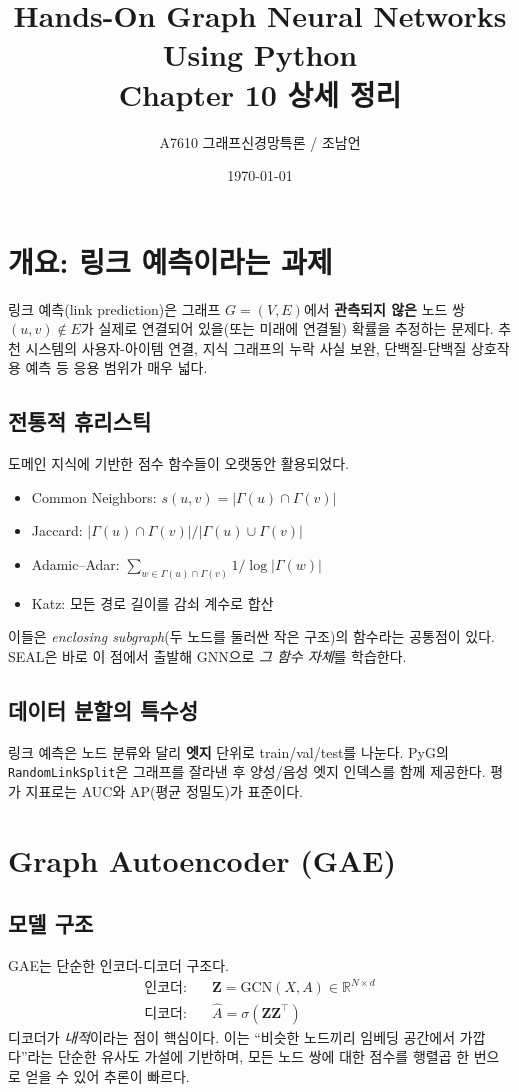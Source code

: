 \documentclass[11pt,a4paper]{article}
\title{Hands-On Graph Neural Networks Using Python\\Chapter 10 상세 정리}
\author{A7610 그래프신경망특론 / 조남언}
\date{\today}
\begin{document}
\maketitle
\tableofcontents
\newpage

\section{개요: 링크 예측이라는 과제}
링크 예측(link prediction)은 그래프 $G=(V,E)$에서 \textbf{관측되지 않은} 노드 쌍 $(u,v)\notin E$가
실제로 연결되어 있을(또는 미래에 연결될) 확률을 추정하는 문제다. 추천 시스템의 사용자-아이템 연결,
지식 그래프의 누락 사실 보완, 단백질-단백질 상호작용 예측 등 응용 범위가 매우 넓다.

\subsection{전통적 휴리스틱}
도메인 지식에 기반한 점수 함수들이 오랫동안 활용되었다.
\begin{itemize}[leftmargin=*]
  \item Common Neighbors: $s(u,v) = |\Gamma(u)\cap\Gamma(v)|$
  \item Jaccard: $|\Gamma(u)\cap\Gamma(v)|/|\Gamma(u)\cup\Gamma(v)|$
  \item Adamic--Adar: $\sum_{w\in\Gamma(u)\cap\Gamma(v)} 1/\log|\Gamma(w)|$
  \item Katz: 모든 경로 길이를 감쇠 계수로 합산
\end{itemize}
이들은 \emph{enclosing subgraph}(두 노드를 둘러싼 작은 구조)의 함수라는 공통점이 있다.
SEAL은 바로 이 점에서 출발해 GNN으로 \emph{그 함수 자체}를 학습한다.

\subsection{데이터 분할의 특수성}
링크 예측은 노드 분류와 달리 \textbf{엣지} 단위로 train/val/test를 나눈다.
PyG의 \texttt{RandomLinkSplit}은 그래프를 잘라낸 후 양성/음성 엣지 인덱스를 함께 제공한다.
평가 지표로는 AUC와 AP(평균 정밀도)가 표준이다.

\section{Graph Autoencoder (GAE)}
\subsection{모델 구조}
GAE는 단순한 인코더-디코더 구조다.
\begin{align*}
  \text{인코더}: & \quad \mathbf{Z} = \mathrm{GCN}(X,A) \in \mathbb{R}^{N\times d} \\
  \text{디코더}: & \quad \hat{A} = \sigma(\mathbf{Z}\mathbf{Z}^\top)
\end{align*}
디코더가 \emph{내적}이라는 점이 핵심이다. 이는 ``비슷한 노드끼리 임베딩 공간에서 가깝다''라는 단순한
유사도 가설에 기반하며, 모든 노드 쌍에 대한 점수를 행렬곱 한 번으로 얻을 수 있어 추론이 빠르다.
\end{document}
